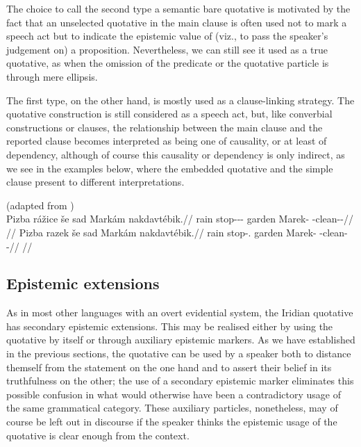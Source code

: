 The choice to call the second type a semantic bare quotative is motivated by the
fact that an unselected quotative in the main clause is often used not to mark a
speech act but to indicate the epistemic value of (viz., to pass the speaker's
judgement on) a proposition. Nevertheless, we can still see it used as a true
quotative, as when the omission of the predicate or the quotative particle is
through mere ellipsis.

The first type, on the other hand, is mostly used as a clause-linking strategy.
The quotative construction is still considered as a speech act, but, like
converbial constructions or  clauses, the relationship between the main
clause and the reported clause becomes interpreted as being one of causality, or
at least of dependency, although of course this causality or dependency is only
indirect, as we see in the examples below, where the embedded quotative and the
simple  clause present to different interpretations.

\pex
  \a(adapted from \cite[3]{tomioka2019})\\
  \begingl
    \gla Pizba rážice še sad Markám nakdavtébik.//
    \glb rain stop-\Av{}-\Pf{}-\Quot{} \Com{} garden Marek-\Agt{} \Incp{}-clean-\Ben{}-\Pf{}//
    \glft {}//
  \endgl
  \a\begingl
    \gla Pizba razek še sad Markám nakdavtébik.//
    \glb rain stop-\Av{}.\Pf{} \Com{} garden Marek-\Agt{} \Incp{}-clean-\Ben{}-\Pf{}//
    \glft {}//
  \endgl
\xe


\subsection{Epistemic extensions}

As in most other languages with an overt evidential system, the Iridian
quotative has secondary epistemic extensions. This may be realised either by
using the quotative by itself or through auxiliary epistemic markers. As we have
established in the previous sections, the quotative can be used by a speaker
both to distance themself from the statement on the one hand and to assert their
belief in its truthfulness on the other; the use of a secondary epistemic marker
eliminates this possible confusion in what would otherwise have been a
contradictory usage of the same grammatical category. These auxiliary particles,
nonetheless, may of course be left out in discourse if the speaker thinks the
epistemic usage of the quotative is clear enough from the context.

